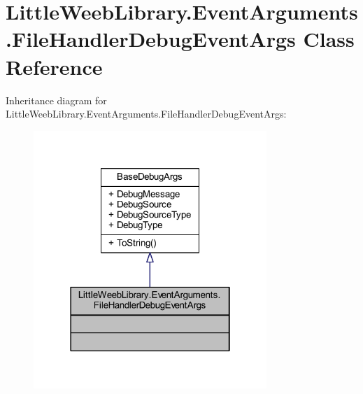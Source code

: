\hypertarget{class_little_weeb_library_1_1_event_arguments_1_1_file_handler_debug_event_args}{}\section{Little\+Weeb\+Library.\+Event\+Arguments.\+File\+Handler\+Debug\+Event\+Args Class Reference}
\label{class_little_weeb_library_1_1_event_arguments_1_1_file_handler_debug_event_args}


Inheritance diagram for Little\+Weeb\+Library.\+Event\+Arguments.\+File\+Handler\+Debug\+Event\+Args\+:\nopagebreak
\begin{figure}[H]
\begin{center}
\leavevmode
\includegraphics[width=250pt]{class_little_weeb_library_1_1_event_arguments_1_1_file_handler_debug_event_args__inherit__graph}
\end{center}
\end{figure}


